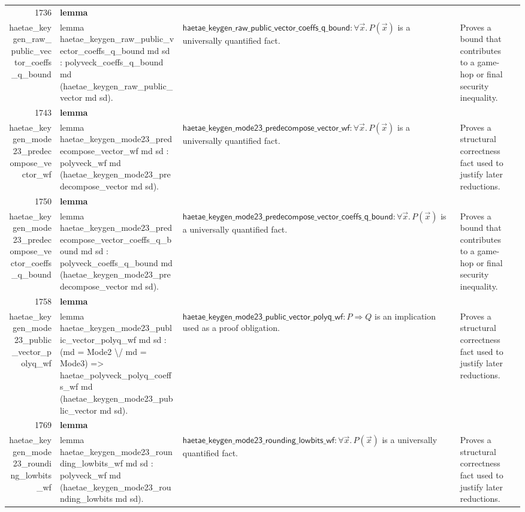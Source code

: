 \documentclass[10pt]{article}
\newcommand{\ec}[1]{\begingroup\ttfamily\scriptsize #1\endgroup}
\begin{document}
\begin{longtable}{r L{0.17\textwidth} L{0.26\textwidth} L{0.27\textwidth} L{0.20\textwidth}}
1736 & \textbf{lemma}\\\ec{haetae\_keygen\_raw\_public\_vector\_coeffs\_q\_bound} & \ec{lemma haetae\_keygen\_raw\_public\_vector\_coeffs\_q\_bound md sd : polyveck\_coeffs\_q\_bound md (haetae\_keygen\_raw\_public\_vector md sd).} & \(\mathsf{haetae\_keygen\_raw\_public\_vector\_coeffs\_q\_bound} : \forall \vec{x}.\, P(\vec{x})\) is a universally quantified fact. & Proves a bound that contributes to a game-hop or final security inequality. \\
1743 & \textbf{lemma}\\\ec{haetae\_keygen\_mode23\_predecompose\_vector\_wf} & \ec{lemma haetae\_keygen\_mode23\_predecompose\_vector\_wf md sd : polyveck\_wf md (haetae\_keygen\_mode23\_predecompose\_vector md sd).} & \(\mathsf{haetae\_keygen\_mode23\_predecompose\_vector\_wf} : \forall \vec{x}.\, P(\vec{x})\) is a universally quantified fact. & Proves a structural correctness fact used to justify later reductions. \\
1750 & \textbf{lemma}\\\ec{haetae\_keygen\_mode23\_predecompose\_vector\_coeffs\_q\_bound} & \ec{lemma haetae\_keygen\_mode23\_predecompose\_vector\_coeffs\_q\_bound md sd : polyveck\_coeffs\_q\_bound md (haetae\_keygen\_mode23\_predecompose\_vector md sd).} & \(\mathsf{haetae\_keygen\_mode23\_predecompose\_vector\_coeffs\_q\_bound} : \forall \vec{x}.\, P(\vec{x})\) is a universally quantified fact. & Proves a bound that contributes to a game-hop or final security inequality. \\
1758 & \textbf{lemma}\\\ec{haetae\_keygen\_mode23\_public\_vector\_polyq\_wf} & \ec{lemma haetae\_keygen\_mode23\_public\_vector\_polyq\_wf md sd : (md = Mode2 \textbackslash{}/ md = Mode3) => haetae\_polyveck\_polyq\_coeffs\_wf md (haetae\_keygen\_mode23\_public\_vector md sd).} & \(\mathsf{haetae\_keygen\_mode23\_public\_vector\_polyq\_wf} : P \Rightarrow Q\) is an implication used as a proof obligation. & Proves a structural correctness fact used to justify later reductions. \\
1769 & \textbf{lemma}\\\ec{haetae\_keygen\_mode23\_rounding\_lowbits\_wf} & \ec{lemma haetae\_keygen\_mode23\_rounding\_lowbits\_wf md sd : polyveck\_wf md (haetae\_keygen\_mode23\_rounding\_lowbits md sd).} & \(\mathsf{haetae\_keygen\_mode23\_rounding\_lowbits\_wf} : \forall \vec{x}.\, P(\vec{x})\) is a universally quantified fact. & Proves a structural correctness fact used to justify later reductions. \\

\end{longtable}
\end{document}
